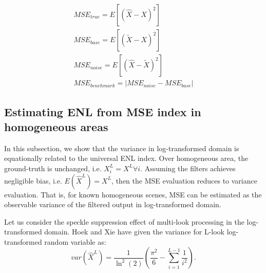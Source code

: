 \documentclass[journal]{IEEEtran}
\begin{document}
\begin{subequations} \label{eqn:eval_metric}
\begin{align}
MSE_{true} = E \left[ (\hat{X} - X)^2 \right] \\
MSE_{base} = E \left[ (\tilde{X} - X)^2 \right] \\
MSE_{noise} = E \left[ (\hat{X} - \tilde{X})^2 \right] \\
MSE_{benchmark} = \left| MSE_{noise} - MSE_{base} \right| 
\end{align}
\end{subequations}

\subsection{ Estimating ENL from MSE index in homogeneous areas }
\label{sec:homogeneous_theoretical}

In this subsection, we show that the variance in log-transformed domain is equationally related to the universal ENL index. 
Over homogeneous area, the ground-truth is unchanged, i.e. $X^L_i=X^L \forall i$.
Assuming the filters achieves negligible bias, i.e. $E(\hat{X}^L)=X^L$, 
	then the MSE evaluation reduces to variance evaluation.
That is, for known homogeneous scenes, MSE can be estimated as the observable variance of the filtered output in log-transformed domain.

Let us consider the speckle suppression effect of multi-look processing in the log-transformed domain. 
Hoek \cite{Hoekman_1991_TGRS} and Xie \cite{Xie_2002_TGRS} have given the variance for L-look log-transformed random variable as: 
\begin{equation}
var(\hat{X}^L)= \frac{1}{\ln^2(2)} \left( \frac{\pi^2}{6} - \sum^{L-1}_{i=1}{\frac{1}{i^2}} \right).
\label{eqn:perf_index_theoretical}
\end{equation}
\end{document}
